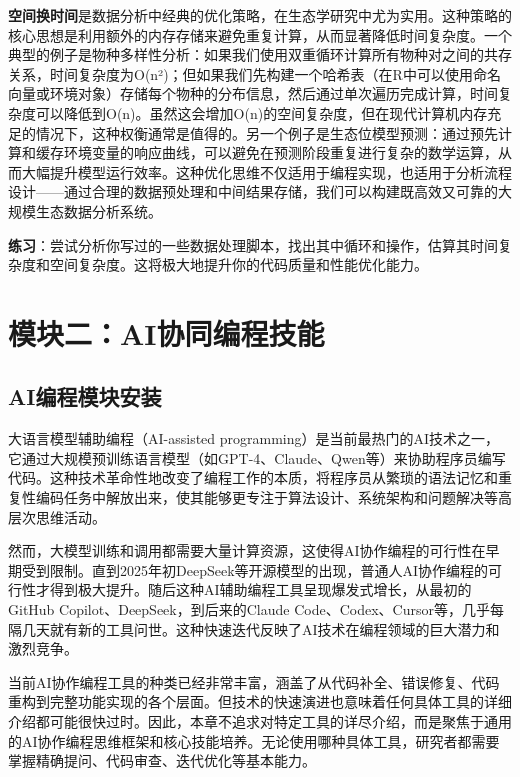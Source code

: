 \documentclass[
]{book}
\begin{document}
\textbf{空间换时间}是数据分析中经典的优化策略，在生态学研究中尤为实用。这种策略的核心思想是利用额外的内存存储来避免重复计算，从而显著降低时间复杂度。一个典型的例子是物种多样性分析：如果我们使用双重循环计算所有物种对之间的共存关系，时间复杂度为O(n²)；但如果我们先构建一个哈希表（在R中可以使用命名向量或环境对象）存储每个物种的分布信息，然后通过单次遍历完成计算，时间复杂度可以降低到O(n)。虽然这会增加O(n)的空间复杂度，但在现代计算机内存充足的情况下，这种权衡通常是值得的。另一个例子是生态位模型预测：通过预先计算和缓存环境变量的响应曲线，可以避免在预测阶段重复进行复杂的数学运算，从而大幅提升模型运行效率。这种优化思维不仅适用于编程实现，也适用于分析流程设计------通过合理的数据预处理和中间结果存储，我们可以构建既高效又可靠的大规模生态数据分析系统。

\textbf{练习}：尝试分析你写过的一些数据处理脚本，找出其中循环和操作，估算其时间复杂度和空间复杂度。这将极大地提升你的代码质量和性能优化能力。

\hypertarget{ux6a21ux5757ux4e8caiux534fux540cux7f16ux7a0bux6280ux80fd}{%
\section{模块二：AI协同编程技能}\label{ux6a21ux5757ux4e8caiux534fux540cux7f16ux7a0bux6280ux80fd}}

\hypertarget{aiux7f16ux7a0bux6a21ux5757ux5b89ux88c5}{%
\subsection{AI编程模块安装}\label{aiux7f16ux7a0bux6a21ux5757ux5b89ux88c5}}

大语言模型辅助编程（AI-assisted programming）是当前最热门的AI技术之一，它通过大规模预训练语言模型（如GPT-4、Claude、Qwen等）来协助程序员编写代码。这种技术革命性地改变了编程工作的本质，将程序员从繁琐的语法记忆和重复性编码任务中解放出来，使其能够更专注于算法设计、系统架构和问题解决等高层次思维活动。

然而，大模型训练和调用都需要大量计算资源，这使得AI协作编程的可行性在早期受到限制。直到2025年初DeepSeek等开源模型的出现，普通人AI协作编程的可行性才得到极大提升。随后这种AI辅助编程工具呈现爆发式增长，从最初的GitHub Copilot、DeepSeek，到后来的Claude Code、Codex、Cursor等，几乎每隔几天就有新的工具问世。这种快速迭代反映了AI技术在编程领域的巨大潜力和激烈竞争。

当前AI协作编程工具的种类已经非常丰富，涵盖了从代码补全、错误修复、代码重构到完整功能实现的各个层面。但技术的快速演进也意味着任何具体工具的详细介绍都可能很快过时。因此，本章不追求对特定工具的详尽介绍，而是聚焦于通用的AI协作编程思维框架和核心技能培养。无论使用哪种具体工具，研究者都需要掌握精确提问、代码审查、迭代优化等基本能力。
\end{document}
